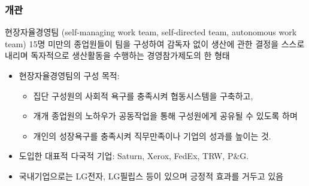 \documentclass[aspectratio=169,xcolor=dvipsnames,handout]{beamer}
\begin{document}
\begin{frame}[allowframebreaks]
    \frametitle{개관}
    \begin{block}{현장자율경영팀 (self-managing work team, self-directed team, autonomous work team)}
        15명 미만의 종업원들이 팀을 구성하여 감독자 없이 생산에 관한 결정을 스스로 내리며 독자적으로 생산활동을 수행하는 경영참가제도의 한 형태
    \end{block}
    \begin{itemize}[<+->]
        \item 현장자율경영팀의 구성 목적:
            \begin{itemize}[<+->]
                \item 집단 구성원의 사회적 욕구를 충족시켜 협동시스템을 구축하고,
                \item 개개 종업원의 노하우가 공동작업을 통해 구성원에게 공유될 수 있도록 하며
                \item 개인의 성장욕구를 충족시켜 직무만족이나 기업의 성과를 높이는 것.
            \end{itemize}
        \item 도입한 대표적 다국적 기업: Saturn, Xerox, FedEx, TRW, P\&G.
        \item 국내기업으로는 LG전자, LG필립스 등이 있으며 긍정적 효과를 거두고 있음
    \end{itemize}
\end{frame}
\end{document}
